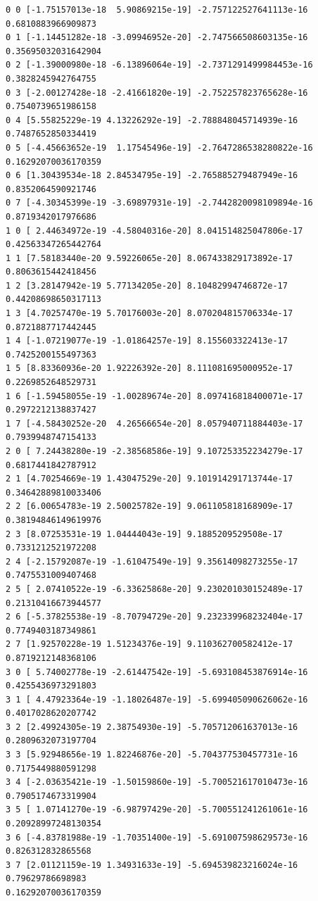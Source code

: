 \documentclass[11pt]{article}
\begin{document}
    \begin{Verbatim}[commandchars=\\\{\}]
0 0 [-1.75157013e-18  5.90869215e-19] -2.757122527641113e-16 0.6810883966909873
0 1 [-1.14451282e-18 -3.09946952e-20] -2.747566508603135e-16 0.35695032031642904
0 2 [-1.39000980e-18 -6.13896064e-19] -2.7371291499984453e-16 0.3828245942764755
0 3 [-2.00127428e-18 -2.41661820e-19] -2.752257823765628e-16 0.7540739651986158
0 4 [5.55825229e-19 4.13226292e-19] -2.788848045714939e-16 0.7487652850334419
0 5 [-4.45663652e-19  1.17545496e-19] -2.7647286538280822e-16
0.16292070036170359
0 6 [1.30439534e-18 2.84534795e-19] -2.765885279487949e-16 0.8352064590921746
0 7 [-4.30345399e-19 -3.69897931e-19] -2.7442820098109894e-16 0.8719342017976686
1 0 [ 2.44634972e-19 -4.58040316e-20] 8.041514825047806e-17 0.42563347265442764
1 1 [7.58183440e-20 9.59226065e-20] 8.067433829173892e-17 0.8063615442418456
1 2 [3.28147942e-19 5.77134205e-20] 8.10482994746872e-17 0.44208698650317113
1 3 [4.70257470e-19 5.70176003e-20] 8.070204815706334e-17 0.8721887717442445
1 4 [-1.07219077e-19 -1.01864257e-19] 8.155603322413e-17 0.7425200155497363
1 5 [8.83360936e-20 1.92226392e-20] 8.111081695000952e-17 0.2269852648529731
1 6 [-1.59458055e-19 -1.00289674e-20] 8.097416818400071e-17 0.2972212138837427
1 7 [-4.58430252e-20  4.26566654e-20] 8.057940711884403e-17 0.7939948747154133
2 0 [ 7.24438280e-19 -2.38568586e-19] 9.107253352234279e-17 0.6817441842787912
2 1 [4.70254669e-19 1.43047529e-20] 9.101914291713744e-17 0.34642889810033406
2 2 [6.00654783e-19 2.50025782e-19] 9.061105818168909e-17 0.38194846149619976
2 3 [8.07253531e-19 1.04444043e-19] 9.1885209529508e-17 0.7331212521972208
2 4 [-2.15792087e-19 -1.61047549e-19] 9.35614098273255e-17 0.7475531009407468
2 5 [ 2.07410522e-19 -6.33625868e-20] 9.230201030152489e-17 0.21310416673944577
2 6 [-5.37825538e-19 -8.70794729e-20] 9.232339968232404e-17 0.7749403187349861
2 7 [1.92570228e-19 1.51234376e-19] 9.110362700582412e-17 0.8719212148368106
3 0 [ 5.74002778e-19 -2.61447542e-19] -5.693108453876914e-16 0.4255436973291803
3 1 [ 4.47923364e-19 -1.18026487e-19] -5.699405090626062e-16 0.4017028620207742
3 2 [2.49924305e-19 2.38754930e-19] -5.705712061637013e-16 0.2809632073197704
3 3 [5.92948656e-19 1.82246876e-20] -5.704377530457731e-16 0.7175449880591298
3 4 [-2.03635421e-19 -1.50159860e-19] -5.700521617010473e-16 0.7905174673319904
3 5 [ 1.07141270e-19 -6.98797429e-20] -5.700551241261061e-16 0.20928997248130354
3 6 [-4.83781988e-19 -1.70351400e-19] -5.691007598629573e-16 0.826312832865568
3 7 [2.01121159e-19 1.34931633e-19] -5.694539823216024e-16 0.79629786698983
0.16292070036170359
    \end{Verbatim}
\end{document}
